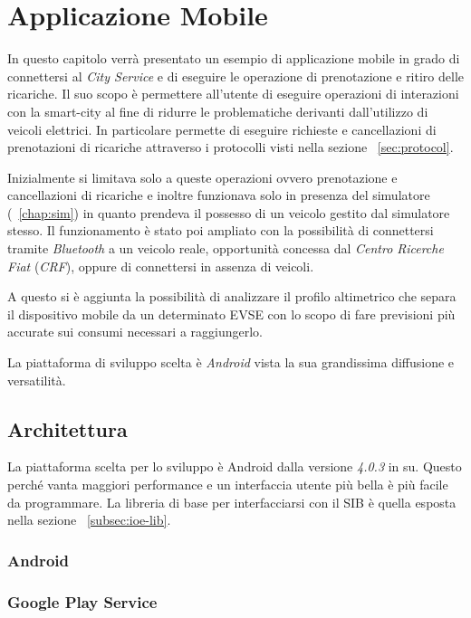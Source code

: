 \chapter{Applicazione Mobile}

In questo capitolo verrà presentato un esempio di applicazione mobile in grado di connettersi al \emph{City Service} e di eseguire le operazione di prenotazione e ritiro delle ricariche. Il suo scopo è permettere all'utente di eseguire operazioni di interazioni con la smart-city al fine di ridurre le problematiche derivanti dall'utilizzo di veicoli elettrici. In particolare permette di eseguire richieste e cancellazioni di prenotazioni di ricariche attraverso i protocolli visti nella sezione ~\ref{sec:protocol}.

Inizialmente si limitava solo a queste operazioni ovvero prenotazione e cancellazioni di ricariche e inoltre funzionava solo in presenza del simulatore (~\ref{chap:sim}) in quanto prendeva il possesso di un veicolo gestito dal simulatore stesso. Il funzionamento è stato poi ampliato con la possibilità di connettersi tramite \emph{Bluetooth} a un veicolo reale, opportunità concessa dal \emph{Centro Ricerche Fiat} (\emph{CRF}), oppure di connettersi in assenza di veicoli.

A questo si è aggiunta la possibilità di analizzare il profilo altimetrico che separa il dispositivo mobile da un determinato EVSE con lo scopo di fare previsioni più accurate sui consumi necessari a raggiungerlo.

La piattaforma di sviluppo scelta è \emph{Android} vista la sua grandissima diffusione e versatilità.

\section{Architettura}

La piattaforma scelta per lo sviluppo è Android dalla versione \emph{4.0.3} in su. Questo perché vanta maggiori performance e un interfaccia utente più bella è più facile da programmare. La libreria di base per interfacciarsi con il SIB è quella esposta nella sezione ~\ref{subsec:ioe-lib}.

\subsection{Android}

\subsection{Google Play Service}

